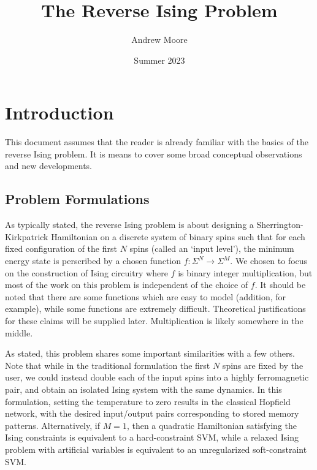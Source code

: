 \documentclass{article}
\title{The Reverse Ising Problem}
\author{Andrew Moore}
\date{Summer 2023}
\begin{document}
\maketitle

\section{Introduction}

This document assumes that the reader is already familiar with the basics of the reverse Ising problem. It is means to cover some broad conceptual observations and new developments.

\subsection{Problem Formulations}

As typically stated, the reverse Ising problem is about designing a Sherrington-Kirkpatrick Hamiltonian on a discrete system of binary spins such that for each fixed configuration of the first $N$ spins (called an `input level'), the minimum energy state is perscribed by a chosen function $f: \Sigma^N \longrightarrow \Sigma^M$. We chosen to focus on the construction of Ising circuitry where $f$ is binary integer multiplication, but most of the work on this problem is independent of the choice of $f$. It should be noted that there are some functions which are easy to model (addition, for example), while some functions are extremely difficult. Theoretical justifications for these claims will be supplied later. Multiplication is likely somewhere in the middle.

As stated, this problem shares some important similarities with a few others. Note that while in the traditional formulation the first $N$ spins are fixed by the user, we could instead double each of the input spins into a highly ferromagnetic pair, and obtain an isolated Ising system with the same dynamics. In this formulation, setting the temperature to zero results in the classical Hopfield network, with the desired input/output pairs corresponding to stored memory patterns. Alternatively, if $M=1$, then a quadratic Hamiltonian satisfying the Ising constraints is equivalent to a hard-constraint SVM, while a relaxed Ising problem with artificial variables is equivalent to an unregularized soft-constraint SVM.
\end{document}
